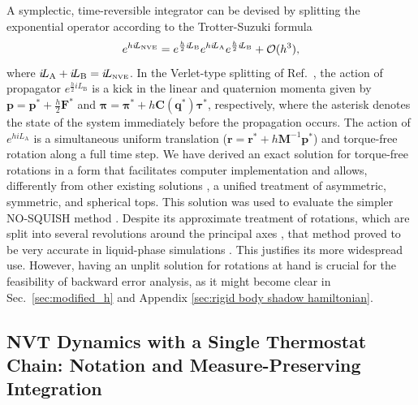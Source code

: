 \documentclass[
journal=jctcce,
layout=twocolumn
]{achemso}
\newcommand{\mt}[1]{\boldsymbol{\mathbf{#1}}}   %
\newcommand{\vt}[1]{\boldsymbol{\mathbf{#1}}}   %
\newcommand{\Liu}[1]{i\!L_\text{#1}}            %
\newcommand{\timestep}{h}
\begin{document}
A symplectic, time-reversible integrator can be devised by splitting the exponential operator according to the Trotter-Suzuki formula \cite{Trotter_1959, Suzuki_1976}
\begin{equation}
\label{eq:splitting NVE}
e^{\timestep \Liu{\tiny NVE}} = e^{\frac{\timestep}{2} \Liu{B}} e^{\timestep \Liu{A}} e^{\frac{\timestep}{2} \Liu{B}} + \mathcal{O}(\timestep^3),
\end{equation}
where $\Liu{A} + \Liu{B} = \Liu{\tiny NVE}$.
In the Verlet-type splitting of Ref.~, the action of propagator $e^{\frac{\timestep}{2} \Liu{B}}$ is a kick in the linear and quaternion momenta given by ${\vt p} = {\vt p}^\ast + \frac{\timestep}{2} {\vt F}^\ast$ and ${\vt \pi} = {\vt \pi}^\ast + \timestep {\mt C}({\vt q^\ast}) {\vt \tau}^\ast$, respectively, where the asterisk denotes the state of the system immediately before the propagation occurs.
The action of $e^{\timestep \Liu{A}}$ is a simultaneous uniform translation (${\vt r} = {\vt r}^\ast + \timestep {\mt M}^{-1} {\vt p}^\ast$) and torque-free rotation along a full time step.
We have derived \cite{Silveira_2017} an exact solution for torque-free rotations in a form that facilitates computer implementation and allows, differently from other existing solutions \cite{Kosenko_1998, vanZon2007, Celledoni_2008}, a unified treatment of asymmetric, symmetric, and spherical tops.
This solution was used to evaluate the simpler NO-SQUISH method \cite{Miller_2002}.
Despite its approximate treatment of rotations, which are split into several revolutions around the principal axes \cite{Dullweber_1997}, that method proved to be very accurate in liquid-phase simulations \cite{Silveira_2017}.
This justifies its more widespread use.
However, having an unplit solution for rotations at hand is crucial for the feasibility of backward error analysis, as it might become clear in Sec.~\ref{sec:modified_h} and Appendix \ref{sec:rigid body shadow hamiltonian}.

\subsection{NVT Dynamics with a Single Thermostat Chain: Notation and Measure-Preserving Integration}
\label{sec:nvt}
\end{document}
